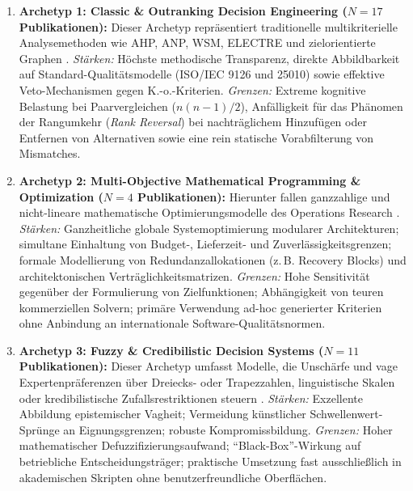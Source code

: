 \begin{enumerate}[label=\textbf{\arabic*.}, leftmargin=*]
  \item \textbf{Archetyp 1: Classic \& Outranking Decision Engineering ($N = 17$ Publikationen):}  
  Dieser Archetyp repräsentiert traditionelle multikriterielle Analysemethoden wie AHP, ANP, WSM, ELECTRE und zielorientierte Graphen \parencite[Dazu gehören:][]{LZQJ6M4X, M3B2D3GD, FCYW9EWJ, DAU8NSK8, TLB687YL, CZZ6XQZJ, 8XNYS4M9, U5JPV4SF, WBGP3ETU, WZM7DUBY, LYMHTPXS, DFASRUVC, JT5X3FIG, QNWK8SAP, UK2X9C4W, RRU375GB, LPC92LAP}.  
  \textit{Stärken:} Höchste methodische Transparenz, direkte Abbildbarkeit auf Standard-Qualitätsmodelle (ISO/IEC 9126 und 25010) sowie effektive Veto-Mechanismen gegen K.-o.-Kriterien.  
  \textit{Grenzen:} Extreme kognitive Belastung bei Paarvergleichen ($n(n-1)/2$), Anfälligkeit für das Phänomen der Rangumkehr (\textit{Rank Reversal}) bei nachträglichem Hinzufügen oder Entfernen von Alternativen sowie eine rein statische Vorabfilterung von Mismatches.
  
  \item \textbf{Archetyp 2: Multi-Objective Mathematical Programming \& Optimization ($N = 4$ Publikationen):}  
  Hierunter fallen ganzzahlige und nicht-lineare mathematische Optimierungsmodelle des Operations Research \parencite[Dazu gehören:][]{ZQMG69VT, MZ8JHDYA, VUVLUN85, YVWGHAWQ}.  
  \textit{Stärken:} Ganzheitliche globale Systemoptimierung modularer Architekturen; simultane Einhaltung von Budget-, Lieferzeit- und Zuverlässigkeitsgrenzen; formale Modellierung von Redundanzallokationen (z.\,B. Recovery Blocks) und architektonischen Verträglichkeitsmatrizen.  
  \textit{Grenzen:} Hohe Sensitivität gegenüber der Formulierung von Zielfunktionen; Abhängigkeit von teuren kommerziellen Solvern; primäre Verwendung ad-hoc generierter Kriterien ohne Anbindung an internationale Software-Qualitätsnormen.
  
  \item \textbf{Archetyp 3: Fuzzy \& Credibilistic Decision Systems ($N = 11$ Publikationen):}  
  Dieser Archetyp umfasst Modelle, die Unschärfe und vage Expertenpräferenzen über Dreiecks- oder Trapezzahlen, linguistische Skalen oder kredibilistische Zufallsrestriktionen steuern \parencite[Dazu gehören:][]{CI86GRRG, 6YJHIVHG, VRTXHQI7, P9SATBH5, B7ZTQCZZ, JX4RDRDU, NZJEEPAC, 5BBYQCJB, UFCEV52H, FVINCQ89, 8KF4HAZS}.  
  \textit{Stärken:} Exzellente Abbildung epistemischer Vagheit; Vermeidung künstlicher Schwellenwert-Sprünge an Eignungsgrenzen; robuste Kompromissbildung.  
  \textit{Grenzen:} Hoher mathematischer Defuzzifizierungsaufwand; \enquote{Black-Box}-Wirkung auf betriebliche Entscheidungsträger; praktische Umsetzung fast ausschließlich in akademischen Skripten ohne benutzerfreundliche Oberflächen.
  

\end{enumerate}
